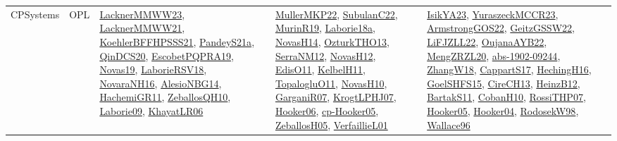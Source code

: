 {\begin{longtable}{llp{6cm}p{6cm}p{6cm}}
CPSystems & OPL & \href{articles/LacknerMMWW23.pdf}{LacknerMMWW23}\cite{LacknerMMWW23}, \href{papers/LacknerMMWW21.pdf}{LacknerMMWW21}\cite{LacknerMMWW21}, \href{articles/KoehlerBFFHPSSS21.pdf}{KoehlerBFFHPSSS21}\cite{KoehlerBFFHPSSS21}, \href{articles/PandeyS21a.pdf}{PandeyS21a}\cite{PandeyS21a}, \href{articles/QinDCS20.pdf}{QinDCS20}\cite{QinDCS20}, \href{articles/EscobetPQPRA19.pdf}{EscobetPQPRA19}\cite{EscobetPQPRA19}, \href{articles/Novas19.pdf}{Novas19}\cite{Novas19}, \href{articles/LaborieRSV18.pdf}{LaborieRSV18}\cite{LaborieRSV18}, \href{articles/NovaraNH16.pdf}{NovaraNH16}\cite{NovaraNH16}, \href{papers/AlesioNBG14.pdf}{AlesioNBG14}\cite{AlesioNBG14}, \href{articles/HachemiGR11.pdf}{HachemiGR11}\cite{HachemiGR11}, \href{articles/ZeballosQH10.pdf}{ZeballosQH10}\cite{ZeballosQH10}, \href{papers/Laborie09.pdf}{Laborie09}\cite{Laborie09}, \href{articles/KhayatLR06.pdf}{KhayatLR06}\cite{KhayatLR06} & \href{articles/MullerMKP22.pdf}{MullerMKP22}\cite{MullerMKP22}, \href{articles/SubulanC22.pdf}{SubulanC22}\cite{SubulanC22}, \href{papers/MurinR19.pdf}{MurinR19}\cite{MurinR19}, \href{papers/Laborie18a.pdf}{Laborie18a}\cite{Laborie18a}, \href{articles/NovasH14.pdf}{NovasH14}\cite{NovasH14}, \href{articles/OzturkTHO13.pdf}{OzturkTHO13}\cite{OzturkTHO13}, \href{papers/SerraNM12.pdf}{SerraNM12}\cite{SerraNM12}, \href{articles/NovasH12.pdf}{NovasH12}\cite{NovasH12}, \href{papers/EdisO11.pdf}{EdisO11}\cite{EdisO11}, \href{articles/KelbelH11.pdf}{KelbelH11}\cite{KelbelH11}, \href{articles/TopalogluO11.pdf}{TopalogluO11}\cite{TopalogluO11}, \href{articles/NovasH10.pdf}{NovasH10}\cite{NovasH10}, \href{papers/GarganiR07.pdf}{GarganiR07}\cite{GarganiR07}, \href{papers/KrogtLPHJ07.pdf}{KrogtLPHJ07}\cite{KrogtLPHJ07}, \href{articles/Hooker06.pdf}{Hooker06}\cite{Hooker06}, \href{papers/cp-Hooker05.pdf}{cp-Hooker05}\cite{cp-Hooker05}, \href{articles/ZeballosH05.pdf}{ZeballosH05}\cite{ZeballosH05}, \href{papers/VerfaillieL01.pdf}{VerfaillieL01}\cite{VerfaillieL01} & \href{articles/IsikYA23.pdf}{IsikYA23}\cite{IsikYA23}, \href{articles/YuraszeckMCCR23.pdf}{YuraszeckMCCR23}\cite{YuraszeckMCCR23}, \href{papers/ArmstrongGOS22.pdf}{ArmstrongGOS22}\cite{ArmstrongGOS22}, \href{papers/GeitzGSSW22.pdf}{GeitzGSSW22}\cite{GeitzGSSW22}, \href{papers/LiFJZLL22.pdf}{LiFJZLL22}\cite{LiFJZLL22}, \href{papers/OujanaAYB22.pdf}{OujanaAYB22}\cite{OujanaAYB22}, \href{articles/MengZRZL20.pdf}{MengZRZL20}\cite{MengZRZL20}, \href{articles/abs-1902-09244.pdf}{abs-1902-09244}\cite{abs-1902-09244}, \href{articles/ZhangW18.pdf}{ZhangW18}\cite{ZhangW18}, \href{papers/CappartS17.pdf}{CappartS17}\cite{CappartS17}, \href{papers/HechingH16.pdf}{HechingH16}\cite{HechingH16}, \href{articles/GoelSHFS15.pdf}{GoelSHFS15}\cite{GoelSHFS15}, \href{papers/CireCH13.pdf}{CireCH13}\cite{CireCH13}, \href{papers/HeinzB12.pdf}{HeinzB12}\cite{HeinzB12}, \href{articles/BartakS11.pdf}{BartakS11}\cite{BartakS11}, \href{papers/CobanH10.pdf}{CobanH10}\cite{CobanH10}, \href{papers/RossiTHP07.pdf}{RossiTHP07}\cite{RossiTHP07}, \href{articles/Hooker05.pdf}{Hooker05}\cite{Hooker05}, \href{papers/Hooker04.pdf}{Hooker04}\cite{Hooker04}, \href{papers/RodosekW98.pdf}{RodosekW98}\cite{RodosekW98}, \href{articles/Wallace96.pdf}{Wallace96}\cite{Wallace96}\\

\end{longtable}}
